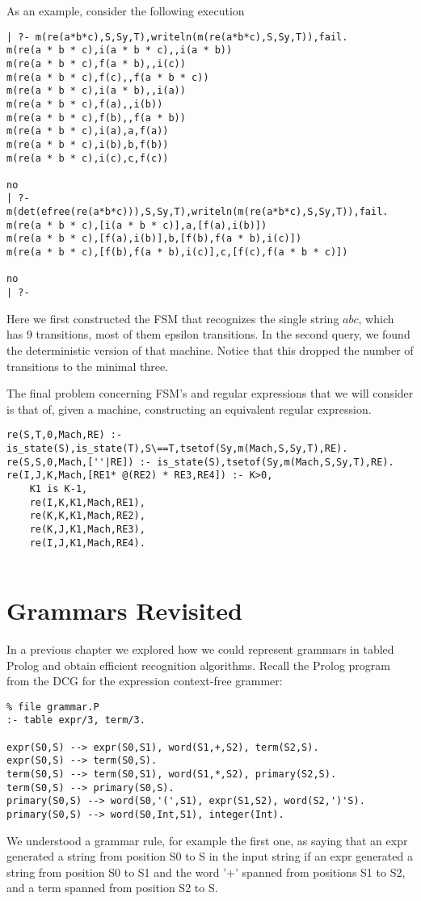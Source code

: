 As an example, consider the following execution
\begin{verbatim}
| ?- m(re(a*b*c),S,Sy,T),writeln(m(re(a*b*c),S,Sy,T)),fail.
m(re(a * b * c),i(a * b * c),,i(a * b))
m(re(a * b * c),f(a * b),,i(c))
m(re(a * b * c),f(c),,f(a * b * c))
m(re(a * b * c),i(a * b),,i(a))
m(re(a * b * c),f(a),,i(b))
m(re(a * b * c),f(b),,f(a * b))
m(re(a * b * c),i(a),a,f(a))
m(re(a * b * c),i(b),b,f(b))
m(re(a * b * c),i(c),c,f(c))

no
| ?- m(det(efree(re(a*b*c))),S,Sy,T),writeln(m(re(a*b*c),S,Sy,T)),fail.
m(re(a * b * c),[i(a * b * c)],a,[f(a),i(b)])
m(re(a * b * c),[f(a),i(b)],b,[f(b),f(a * b),i(c)])
m(re(a * b * c),[f(b),f(a * b),i(c)],c,[f(c),f(a * b * c)])

no
| ?- 
\end{verbatim}

Here we first constructed the FSM that recognizes the single string
$abc$, which has 9 transitions, most of them epsilon transitions.  In
the second query, we found the deterministic version of that machine.
Notice that this dropped the number of transitions to the minimal
three.

The final problem concerning FSM's and regular expressions that we
will consider is that of, given a machine, constructing an equivalent
regular expression.

\begin{verbatim}
re(S,T,0,Mach,RE) :- is_state(S),is_state(T),S\==T,tsetof(Sy,m(Mach,S,Sy,T),RE).
re(S,S,0,Mach,[''|RE]) :- is_state(S),tsetof(Sy,m(Mach,S,Sy,T),RE).
re(I,J,K,Mach,[RE1* @(RE2) * RE3,RE4]) :- K>0,
    K1 is K-1,
    re(I,K,K1,Mach,RE1),
    re(K,K,K1,Mach,RE2),
    re(K,J,K1,Mach,RE3),
    re(I,J,K1,Mach,RE4).


\end{verbatim}


\section{Grammars Revisited}
In a previous chapter we explored how we could represent grammars in
tabled Prolog and obtain efficient recognition algorithms.  Recall the
Prolog program from the DCG for the expression context-free grammer:
\begin{verbatim}
% file grammar.P
:- table expr/3, term/3.

expr(S0,S) --> expr(S0,S1), word(S1,+,S2), term(S2,S).
expr(S0,S) --> term(S0,S).
term(S0,S) --> term(S0,S1), word(S1,*,S2), primary(S2,S).
term(S0,S) --> primary(S0,S).
primary(S0,S) --> word(S0,'(',S1), expr(S1,S2), word(S2,')'S).
primary(S0,S) --> word(S0,Int,S1), integer(Int).
\end{verbatim}
We understood a grammar rule, for example the first one, as saying
that an expr generated a string from position S0 to S in the input
string if an expr generated a string from position S0 to S1 and the
word '+' spanned from positions S1 to S2, and a term spanned from
position S2 to S.  

